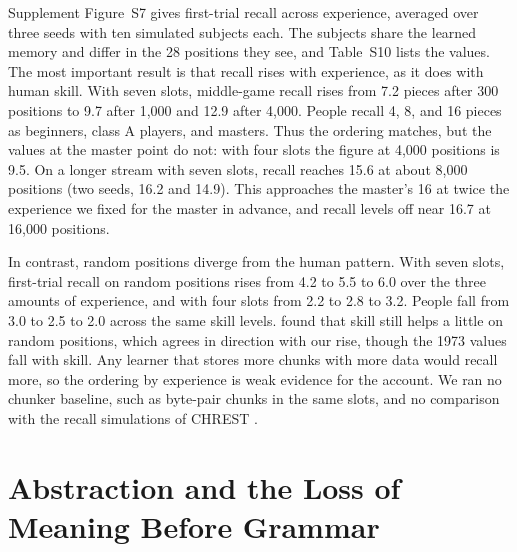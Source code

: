 \documentclass[11pt,letterpaper]{article}
\begin{document}
Supplement Figure~S7 gives first-trial recall across experience, averaged over three seeds with ten simulated subjects each. The subjects share the learned memory and differ in the 28 positions they see, and Table~S10 lists the values.
The most important result is that recall rises with experience, as it does with human skill. With seven slots, middle-game recall rises from 7.2 pieces after 300 positions to 9.7 after 1,000 and 12.9 after 4,000.
People recall 4, 8, and 16 pieces as beginners, class A players, and masters. Thus the ordering matches, but the values at the master point do not: with four slots the figure at 4,000 positions is 9.5.
On a longer stream with seven slots, recall reaches 15.6 at about 8,000 positions (two seeds, 16.2 and 14.9). This approaches the master's 16 at twice the experience we fixed for the master in advance, and recall levels off near 16.7 at 16,000 positions.

In contrast, random positions diverge from the human pattern. With seven slots, first-trial recall on random positions rises from 4.2 to 5.5 to 6.0 over the three amounts of experience, and with four slots from 2.2 to 2.8 to 3.2.
People fall from 3.0 to 2.5 to 2.0 across the same skill levels.
\citet{gobet-simon-random} found that skill still helps a little on random positions, which agrees in direction with our rise, though the 1973 values fall with skill.
Any learner that stores more chunks with more data would recall more, so the ordering by experience is weak evidence for the account.
We ran no chunker baseline, such as byte-pair chunks in the same slots, and no comparison with the recall simulations of CHREST \citep{gobet-simon-five-seconds}.
\section{Abstraction and the Loss of Meaning Before Grammar}
\end{document}

